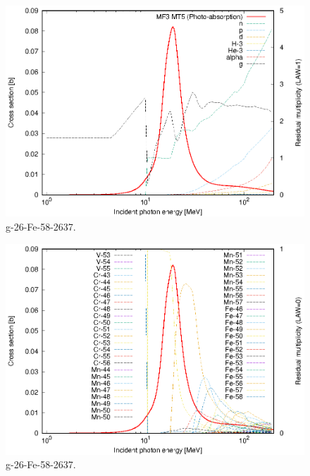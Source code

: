 \begin{figure}
 \includegraphics[width=\linewidth]{eps/g_26-Fe-58_2637.eps}
  \caption{g-26-Fe-58-2637.}
\end{figure}
\begin{figure}
 \includegraphics[width=\linewidth]{eps-law0/g_26-Fe-58_2637.eps}
 \caption{g-26-Fe-58-2637.}
\end{figure}
\newpage \clearpage

